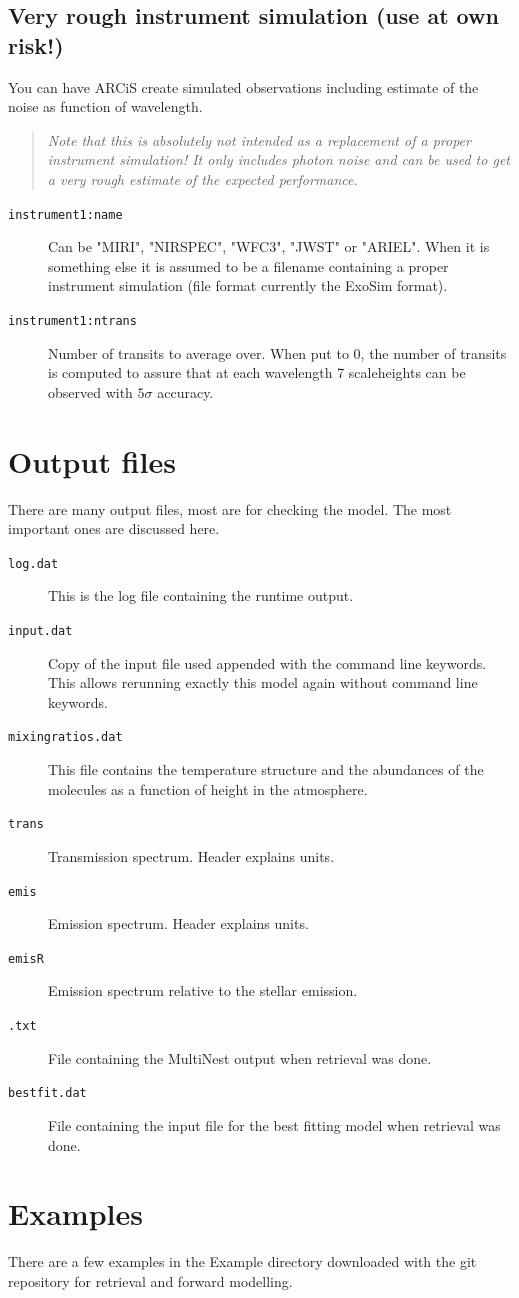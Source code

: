 \documentclass[12pt]{article}
\begin{document}
\subsection{Very rough instrument simulation (use at own risk!)}

You can have ARCiS create simulated observations including estimate of the noise as function of wavelength. 
\begin{quote}
\emph{Note that this is absolutely not intended as a replacement of a proper instrument simulation! It only includes photon noise and can be used to get a very rough estimate of the expected performance.}
\end{quote}

\begin{description}

\item[\texttt{instrument1:name}]
Can be "MIRI", "NIRSPEC", "WFC3", "JWST" or "ARIEL". When it is something else it is assumed to be a filename containing a proper instrument simulation (file format currently the ExoSim format).
\item[\texttt{instrument1:ntrans}]
Number of transits to average over. When put to $0$, the number of transits is computed to assure that at each wavelength 7 scaleheights can be observed with $5\sigma$ accuracy.
\end{description}

\section{Output files}

There are many output files, most are for checking the model. The most important ones are discussed here.

\begin{description}
\item[\texttt{log.dat}]
This is the log file containing the runtime output.
\item[\texttt{input.dat}]
Copy of the input file used appended with the command line keywords. This allows rerunning exactly this model again without command line keywords.
\item[\texttt{mixingratios.dat}]
This file contains the temperature structure and the abundances of the molecules as a function of height in the atmosphere.
\item[\texttt{trans}]
Transmission spectrum. Header explains units.
\item[\texttt{emis}]
Emission spectrum. Header explains units.
\item[\texttt{emisR}]
Emission spectrum relative to the stellar emission.
\item[\texttt{.txt}]
File containing the MultiNest output when retrieval was done.
\item[\texttt{bestfit.dat}]
File containing the input file for the best fitting model when retrieval was done.
\end{description}

\section{Examples}

There are a few examples in the Example directory downloaded with the git repository for retrieval and forward modelling.

\end{document}
